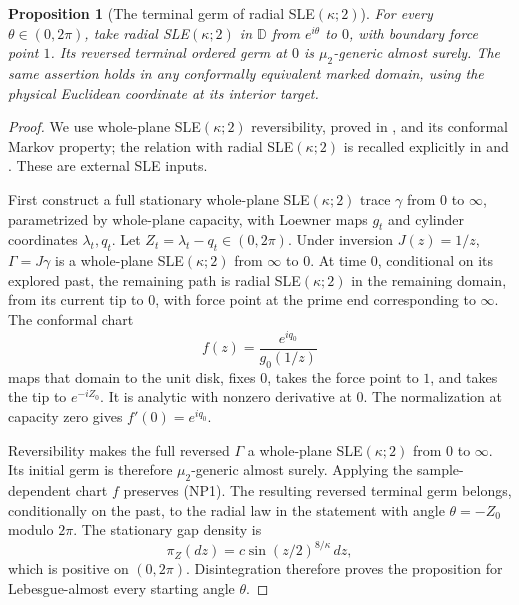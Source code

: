 \documentclass[11pt]{article}
\newtheorem{proposition}[theorem]{Proposition}
\theoremstyle{definition}\newtheorem{definition}[theorem]{Definition}
\theoremstyle{remark}\newtheorem{remark}[theorem]{Remark}
\begin{document}
\begin{proposition}[The terminal germ of radial SLE$(\kappa;2)$]
\label{prop:radial-two-terminal-germ}
For every $\theta\in(0,2\pi)$, take radial SLE$(\kappa;2)$ in
$\mathbb D$ from $e^{i\theta}$ to $0$, with boundary force point $1$.
Its reversed terminal ordered germ at $0$ is $\mu_2$-generic almost
surely. The same assertion holds in any conformally equivalent marked
domain, using the physical Euclidean coordinate at its interior target.
\end{proposition}
\begin{proof}
We use whole-plane SLE$(\kappa;2)$ reversibility, proved in
\cite[Theorem 1.20]{ms-ig4}, and its conformal Markov property;
the relation with radial SLE$(\kappa;2)$ is recalled explicitly in
\cite[Section 2.1]{zhan-natural-regularity} and
\cite[Section 2.2]{zhan-loops}. These are external SLE inputs.

First construct a full stationary whole-plane SLE$(\kappa;2)$ trace
$\gamma$ from $0$ to $\infty$, parametrized by whole-plane capacity,
with Loewner maps $g_t$ and cylinder coordinates $\lambda_t,q_t$.
Let $Z_t=\lambda_t-q_t\in(0,2\pi)$.
Under inversion $J(z)=1/z$, $\Gamma=J\gamma$ is a whole-plane
SLE$(\kappa;2)$ from $\infty$ to $0$. At time $0$, conditional
on its explored past, the remaining path is radial SLE$(\kappa;2)$
in the remaining domain, from its current tip to $0$, with force
point at the prime end corresponding to $\infty$.
The conformal chart
\[
 f(z)=\frac{e^{iq_0}}{g_0(1/z)}
 \tag{NP2}
\]
maps that domain to the unit disk, fixes $0$, takes the force point
to $1$, and takes the tip to $e^{-iZ_0}$. It is analytic with nonzero
derivative at $0$. The normalization at capacity zero gives
$f'(0)=e^{iq_0}$.

Reversibility makes the full reversed $\Gamma$ a whole-plane
SLE$(\kappa;2)$ from $0$ to $\infty$. Its initial germ is therefore
$\mu_2$-generic almost surely. Applying the sample-dependent chart
$f$ preserves (NP1). The resulting reversed terminal germ belongs,
conditionally on the past, to the radial law in the statement with
angle $\theta=-Z_0$ modulo $2\pi$.
The stationary gap density is
\[
 \pi_Z(dz)=c\sin(z/2)^{8/\kappa}\,dz,
 \tag{NP3}
\]
which is positive on $(0,2\pi)$. Disintegration therefore proves the
proposition for Lebesgue-almost every starting angle $\theta$.


\end{proof}
\end{document}
